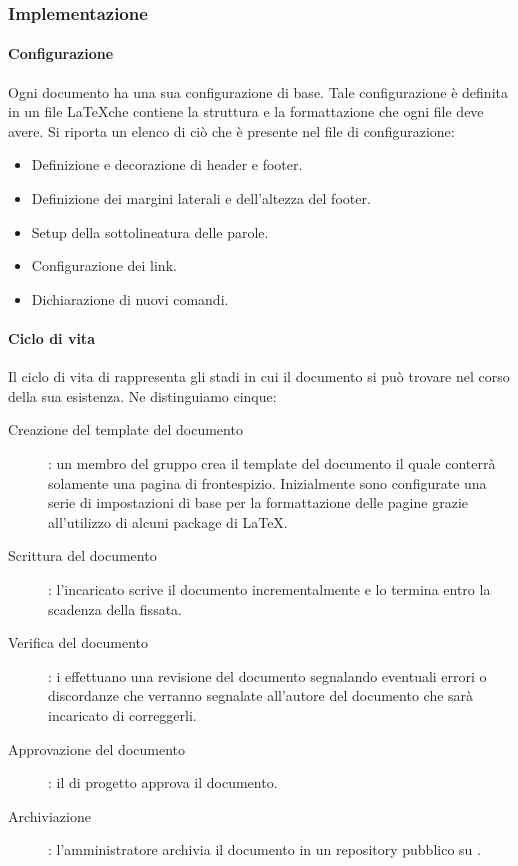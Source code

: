 \documentclass[../norme-di-progetto.tex]{subfiles}
\begin{document}
\subsubsection{Implementazione}%
\label{subs:implementazione}

\paragraph{Configurazione}%
\label{par:configurazione}
Ogni documento ha una sua configurazione di base. Tale configurazione è definita in un file \LaTeX  che contiene la struttura e la formattazione che ogni file deve avere. Si riporta un elenco di ciò che è presente nel file di configurazione:

\begin{itemize}
  \item Definizione e decorazione di header e footer.
  \item Definizione dei margini laterali e dell'altezza del footer.
  \item Setup della sottolineatura delle parole.
  \item Configurazione dei link.
  \item Dichiarazione di nuovi comandi.
\end{itemize}

\paragraph{Ciclo di vita}%
\label{par:ciclo di vita}
Il ciclo di vita di rappresenta gli stadi in cui il documento si può trovare nel corso della sua esistenza. Ne distinguiamo cinque:
\begin{description}
  \item [Creazione del template del documento]: un membro del gruppo crea il template del documento il quale conterrà solamente una pagina di frontespizio. Inizialmente sono configurate una serie di impostazioni di base per la formattazione delle pagine grazie all'utilizzo di alcuni package di \LaTeX.
  \item [Scrittura del documento]: l'incaricato scrive il documento incrementalmente e lo termina entro la scadenza della  fissata.
  \item [Verifica del documento]: i  effettuano una revisione del documento segnalando eventuali errori o discordanze che verranno segnalate all'autore del documento che sarà incaricato di correggerli.
  \item [Approvazione del documento]: il  di progetto approva il documento.
  \item [Archiviazione]: l'amministratore archivia il documento in un repository pubblico su .
\end{description}
\end{document}
